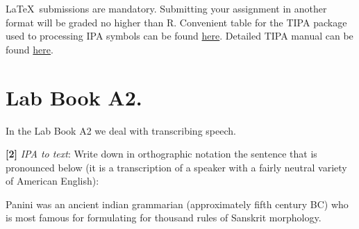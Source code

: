 \documentclass{../labbook}
\begin{document}
\begin{mdframed}[backgroundcolor=blue!20]
\LaTeX ~submissions are mandatory. Submitting your assignment in another format will be graded no higher than R. Convenient table for the TIPA package used to processing IPA symbols can be found \href{https://jon.dehdari.org/tutorials/tipachart_mod.pdf}{here}. Detailed TIPA manual can be found \href{http://www.l.u-tokyo.ac.jp/~fkr/tipa/tipaman.pdf}{here}.
\end{mdframed}

\tableofcontents %

\section{Lab Book A2. }
In the Lab Book A2 we deal with transcribing speech. 

\begin{problem}{1}
\textbf{[2]} \textit{IPA to text}: Write down in orthographic notation the sentence  that is pronounced below (it is a transcription of a speaker with a fairly neutral variety of American English):

\end{problem}
\begin{solution}
Panini was an ancient indian grammarian (approximately fifth century BC) who is most famous for formulating for thousand rules of Sanskrit morphology.
\end{solution}
\end{document}
